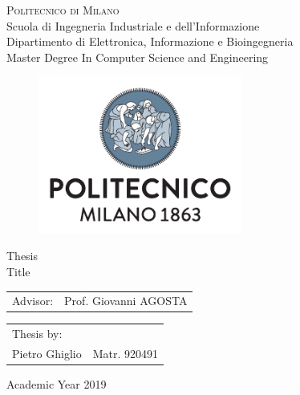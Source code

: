 
\begin{center}
\textsc{\Large{}Politecnico di Milano}\\
{\Large{}Scuola di Ingegneria Industriale e dell'Informazione}\\
{\large{}Dipartimento di Elettronica, Informazione e Bioingegneria}\\
{\large{}Master Degree In Computer Science and Engineering}

\par\end{center}{\large \par}

\vspace{0.3cm}
\begin{center}
\begin{figure}[h]
\centering{}\includegraphics[width=0.6\textwidth]{title-page/logo-polimi}
\end{figure}
\vspace{0.7cm}
\par\end{center}

\begin{center}
{\LARGE{}Thesis}\\
{\LARGE{}Title}\vspace{2cm}
\par\end{center}

\begin{flushleft}
\begin{tabular}{ll}
Advisor:  & Prof. Giovanni AGOSTA\tabularnewline
\end{tabular}\vspace{1cm}
\par\end{flushleft}

\begin{flushright}
\begin{tabular}{ll}
Thesis by: & \tabularnewline
Pietro Ghiglio& Matr. 920491\tabularnewline
\end{tabular}\vspace{4cm}
\par\end{flushright}

\begin{center}
{\large{}Academic Year 2019}
\par\end{center}{\large \par}

\restoregeometry
